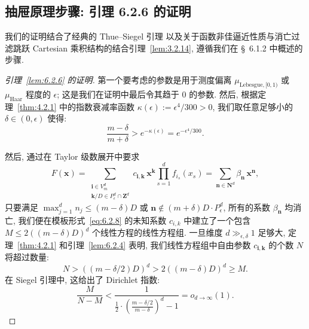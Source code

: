 \subsection{抽屉原理步骤: 引理 6.2.6 的证明}\label{sec:6.3}

我们的证明结合了经典的 Thue--Siegel 引理 \cite[Lemma 2.9.1]{BG06} 以及关于函数非佳逼近性质与消亡过滤跳跃 Cartesian 乘积结构的结合引理~\ref{lem:3.2.14}, 遵循我们在 \S~6.1.2 中概述的步骤.

\begin{proof}[引理~\ref{lem:6.2.6} 的证明]
第一个要考虑的参数是用于测度偏离 $\mu_{\text{Lebesgue},[0,1)}$ 或 $\mu_{\text{Haar}}$ 程度的 $\epsilon$; 这是我们在证明中最后令其趋于 $0$ 的参数.
然后, 根据定理~\ref{thm:4.2.1} 中的指数衰减率函数 $\kappa(\epsilon) := \epsilon^4/300 > 0$, 我们取任意足够小的 $\delta \in (0, \epsilon)$ 使得:
\begin{equation}\label{eq:6.3.1}
\frac{m-\delta}{m+\delta} > e^{-\kappa(\epsilon)} = e^{-\epsilon^4/300}.
\end{equation}

然后, 通过在 Taylor 级数展开中要求
\begin{equation}\label{eq:6.3.2}
F(\mathbf{x}) = \sum_{\substack{\mathbf{i} \in V_m^d \\ \mathbf{k}/D \in P_{\epsilon}^d \cap \mathbf{Z}^d}} c_{\mathbf{i}, \mathbf{k}} \, \mathbf{x}^{\mathbf{k}} \prod_{s=1}^d f_{i_s}(x_s) = \sum_{\mathbf{n} \in \mathbf{N}^d} \beta_{\mathbf{n}} \, \mathbf{x}^{\mathbf{n}},
\end{equation}
只要满足 $\max_{j=1}^{d} n_{j} \leq (m-\delta)D$ 或 $\mathbf{n} \notin (m+\delta)D \cdot P_{\epsilon}^{d}$, 所有的系数 $\beta_{\mathbf{n}}$ 均消亡, 我们便在模板形式~\eqref{eq:6.2.8} 的未知系数 $c_{i,k}$ 中建立了一个包含 $M \leq 2((m-\delta)D)^d$ 个线性方程的线性方程组.
一旦维度 $d \gg_{\epsilon,\delta} 1$ 足够大, 定理~\ref{thm:4.2.1} 和引理~\ref{lem:6.2.4} 表明, 我们线性方程组中自由参数 $c_{\mathbf{i},\mathbf{k}}$ 的个数 $N$ 将超过数量:
\begin{equation}\label{eq:6.3.3}
N > ((m - \delta/2)D)^d > 2((m - \delta)D)^d \ge M.
\end{equation}
在 Siegel 引理中, 这给出了 Dirichlet 指数:
\begin{equation}\label{eq:6.3.4}
\frac{M}{N-M} < \frac{1}{\frac{1}{2} \cdot \left(\frac{m-\delta/2}{m-\delta}\right)^d - 1} = o_{d\to\infty}(1).
\end{equation}


\end{proof}
